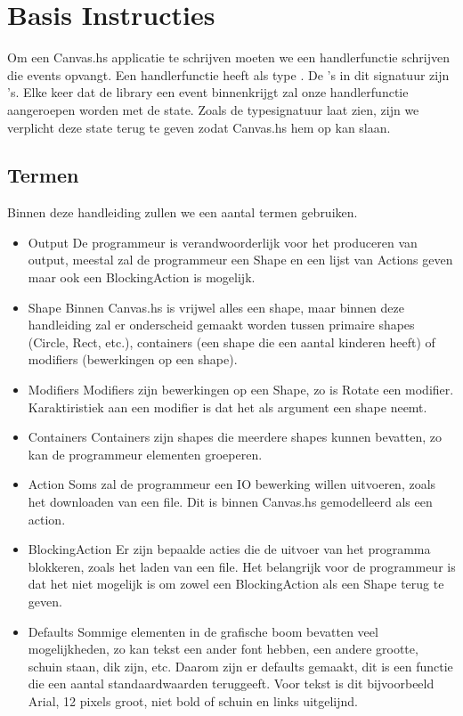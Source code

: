 \section{Basis Instructies}

Om een Canvas.hs applicatie te schrijven moeten we een handlerfunctie schrijven die events opvangt. Een handlerfunctie heeft als type . De 's in dit signatuur zijn 's. Elke keer dat de library een event binnenkrijgt zal onze handlerfunctie aangeroepen worden met de state. Zoals de typesignatuur laat zien, zijn we verplicht deze state terug te geven zodat Canvas.hs hem op kan slaan.

\subsection{Termen}
Binnen deze handleiding zullen we een aantal termen gebruiken.
\begin{itemize}
	\item Output
De programmeur is verandwoorderlijk voor het produceren van output, meestal zal de programmeur een Shape en een lijst van Actions geven maar ook een BlockingAction is mogelijk.
	\item Shape
Binnen Canvas.hs is vrijwel alles een shape, maar binnen deze handleiding zal er onderscheid gemaakt worden tussen primaire shapes (Circle, Rect, etc.), containers (een shape die een aantal kinderen heeft) of modifiers (bewerkingen op een shape).
	\item Modifiers
Modifiers zijn bewerkingen op een Shape, zo is Rotate een modifier. Karaktiristiek aan een modifier is dat het als argument een shape neemt.
	\item Containers
Containers zijn shapes die meerdere shapes kunnen bevatten, zo kan de programmeur elementen groeperen.
	\item Action
Soms zal de programmeur een IO bewerking willen uitvoeren, zoals het downloaden van een file. Dit is binnen Canvas.hs gemodelleerd als een action.
	\item BlockingAction
Er zijn bepaalde acties die de uitvoer van het programma blokkeren, zoals het laden van een file. Het belangrijk voor de programmeur is dat het niet mogelijk is om zowel een BlockingAction als een Shape terug te geven. 
    \item Defaults
Sommige elementen in de grafische boom bevatten veel mogelijkheden, zo kan tekst een ander font hebben, een andere grootte, schuin staan, dik zijn, etc. Daarom zijn er defaults gemaakt, dit is een functie die een aantal standaardwaarden teruggeeft. Voor tekst is dit bijvoorbeeld Arial, 12 pixels groot, niet bold of schuin en links uitgelijnd.
\end{itemize}

